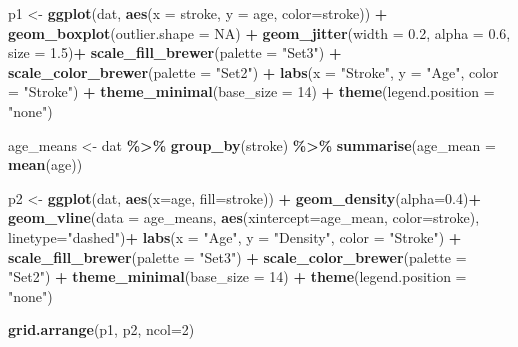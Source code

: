 \documentclass[
]{article}
\newenvironment{Shaded}{\begin{snugshade}}{\end{snugshade}}
\newcommand{\AttributeTok}[1]{\textcolor[rgb]{0.13,0.29,0.53}{#1}}
\newcommand{\ConstantTok}[1]{\textcolor[rgb]{0.56,0.35,0.01}{#1}}
\newcommand{\DecValTok}[1]{\textcolor[rgb]{0.00,0.00,0.81}{#1}}
\newcommand{\FloatTok}[1]{\textcolor[rgb]{0.00,0.00,0.81}{#1}}
\newcommand{\FunctionTok}[1]{\textcolor[rgb]{0.13,0.29,0.53}{\textbf{#1}}}
\newcommand{\NormalTok}[1]{#1}
\newcommand{\OtherTok}[1]{\textcolor[rgb]{0.56,0.35,0.01}{#1}}
\newcommand{\SpecialCharTok}[1]{\textcolor[rgb]{0.81,0.36,0.00}{\textbf{#1}}}
\newcommand{\StringTok}[1]{\textcolor[rgb]{0.31,0.60,0.02}{#1}}
\begin{document}
\begin{Shaded}
\begin{Highlighting}[]
\NormalTok{p1 }\OtherTok{\textless{}{-}} \FunctionTok{ggplot}\NormalTok{(dat, }\FunctionTok{aes}\NormalTok{(}\AttributeTok{x =}\NormalTok{ stroke, }\AttributeTok{y =}\NormalTok{ age, }\AttributeTok{color=}\NormalTok{stroke)) }\SpecialCharTok{+} 
      \FunctionTok{geom\_boxplot}\NormalTok{(}\AttributeTok{outlier.shape =} \ConstantTok{NA}\NormalTok{) }\SpecialCharTok{+}
      \FunctionTok{geom\_jitter}\NormalTok{(}\AttributeTok{width =} \FloatTok{0.2}\NormalTok{, }\AttributeTok{alpha =} \FloatTok{0.6}\NormalTok{, }\AttributeTok{size =} \FloatTok{1.5}\NormalTok{)}\SpecialCharTok{+}
      \FunctionTok{scale\_fill\_brewer}\NormalTok{(}\AttributeTok{palette =} \StringTok{"Set3"}\NormalTok{) }\SpecialCharTok{+}
      \FunctionTok{scale\_color\_brewer}\NormalTok{(}\AttributeTok{palette =} \StringTok{"Set2"}\NormalTok{) }\SpecialCharTok{+}
      \FunctionTok{labs}\NormalTok{(}\AttributeTok{x =} \StringTok{"Stroke"}\NormalTok{, }\AttributeTok{y =} \StringTok{"Age"}\NormalTok{, }\AttributeTok{color =} \StringTok{"Stroke"}\NormalTok{) }\SpecialCharTok{+}
      \FunctionTok{theme\_minimal}\NormalTok{(}\AttributeTok{base\_size =} \DecValTok{14}\NormalTok{) }\SpecialCharTok{+}
      \FunctionTok{theme}\NormalTok{(}\AttributeTok{legend.position =} \StringTok{"none"}\NormalTok{)  }


\NormalTok{age\_means }\OtherTok{\textless{}{-}}\NormalTok{ dat }\SpecialCharTok{\%\textgreater{}\%} \FunctionTok{group\_by}\NormalTok{(stroke) }\SpecialCharTok{\%\textgreater{}\%} \FunctionTok{summarise}\NormalTok{(}\AttributeTok{age\_mean =} \FunctionTok{mean}\NormalTok{(age)) }

\NormalTok{p2 }\OtherTok{\textless{}{-}} \FunctionTok{ggplot}\NormalTok{(dat, }\FunctionTok{aes}\NormalTok{(}\AttributeTok{x=}\NormalTok{age, }\AttributeTok{fill=}\NormalTok{stroke)) }\SpecialCharTok{+}  \FunctionTok{geom\_density}\NormalTok{(}\AttributeTok{alpha=}\FloatTok{0.4}\NormalTok{)}\SpecialCharTok{+}
      \FunctionTok{geom\_vline}\NormalTok{(}\AttributeTok{data =}\NormalTok{ age\_means, }\FunctionTok{aes}\NormalTok{(}\AttributeTok{xintercept=}\NormalTok{age\_mean, }\AttributeTok{color=}\NormalTok{stroke), }\AttributeTok{linetype=}\StringTok{"dashed"}\NormalTok{)}\SpecialCharTok{+}
      \FunctionTok{labs}\NormalTok{(}\AttributeTok{x =} \StringTok{"Age"}\NormalTok{, }\AttributeTok{y =} \StringTok{"Density"}\NormalTok{, }\AttributeTok{color =} \StringTok{"Stroke"}\NormalTok{) }\SpecialCharTok{+}
      \FunctionTok{scale\_fill\_brewer}\NormalTok{(}\AttributeTok{palette =} \StringTok{"Set3"}\NormalTok{) }\SpecialCharTok{+}
      \FunctionTok{scale\_color\_brewer}\NormalTok{(}\AttributeTok{palette =} \StringTok{"Set2"}\NormalTok{) }\SpecialCharTok{+}
      \FunctionTok{theme\_minimal}\NormalTok{(}\AttributeTok{base\_size =} \DecValTok{14}\NormalTok{) }\SpecialCharTok{+}
      \FunctionTok{theme}\NormalTok{(}\AttributeTok{legend.position =} \StringTok{"none"}\NormalTok{)}

\FunctionTok{grid.arrange}\NormalTok{(p1, p2, }\AttributeTok{ncol=}\DecValTok{2}\NormalTok{)}
\end{Highlighting}
\end{Shaded}
\end{document}
